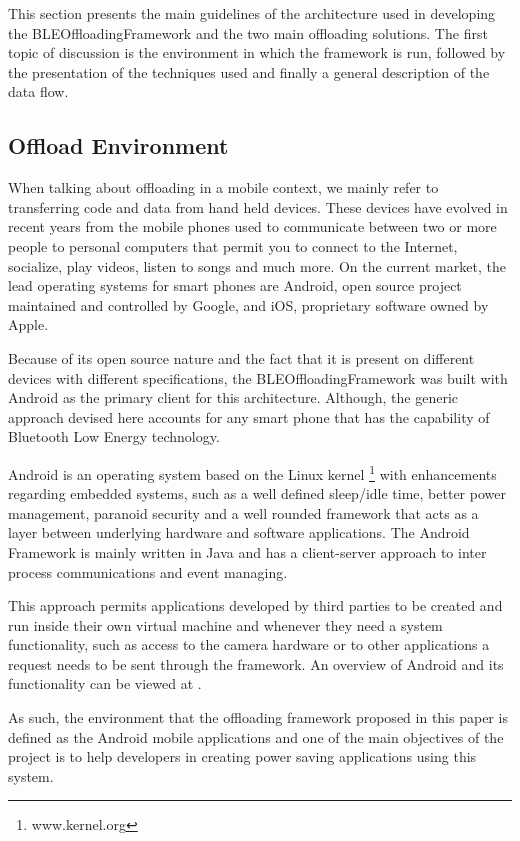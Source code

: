 \documentclass[twoside]{article}
\begin{document}
\begin{multicols}{2}
This section presents the main guidelines of the architecture used in developing the BLEOffloadingFramework and the two main offloading solutions. The first topic of discussion is the environment in which the framework is run, followed by the presentation of the techniques used and finally a general description of the data flow.

\subsection{Offload Environment}
\label{environment}

When talking about offloading in a mobile context, we mainly refer to transferring code and data from hand held devices. These devices have evolved in recent years from the mobile phones used to communicate between two or more people to personal computers that permit you to connect to the Internet, socialize, play videos, listen to songs and much more. On the current market, the lead operating systems for smart phones are Android, open source project maintained and controlled by Google, and iOS, proprietary software owned by Apple.

Because of its open source nature and the fact that it is present on different devices with different specifications, the BLEOffloadingFramework was built with Android as the primary client for this architecture. Although, the generic approach devised here accounts for any smart phone that has the capability of Bluetooth Low Energy technology.

Android is an operating system based on the Linux kernel \footnote{www.kernel.org} with enhancements regarding embedded systems, such as a well defined sleep/idle time, better power management, paranoid security and a well rounded framework that acts as a layer between underlying hardware and software applications. The Android Framework is mainly written in Java and has a client-server approach to inter process communications and event managing.

This approach permits applications developed by third parties to be created and run inside their own virtual machine and whenever they need a system functionality, such as access to the camera hardware or to other applications a request needs to be sent through the framework. An overview of Android and its functionality can be viewed at \cite{Android}.

As such, the environment that the offloading framework proposed in this paper is defined as the Android mobile applications and one of the main objectives of the project is to help developers in creating power saving applications using this system.


\end{multicols}
\end{document}
